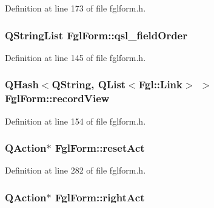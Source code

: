 Definition at line 173 of file fglform.h.

\hypertarget{classFglForm_ab53b016e506ad4ed7fdb2ac2210d43b1}{
\subsubsection[{qsl\_\-fieldOrder}]{\setlength{\rightskip}{0pt plus 5cm}QStringList {\bf FglForm::qsl\_\-fieldOrder}}}
\label{classFglForm_ab53b016e506ad4ed7fdb2ac2210d43b1}


Definition at line 145 of file fglform.h.

\hypertarget{classFglForm_a2e8895a4cd6f58cc36f31c8a51c06a54}{
\subsubsection[{recordView}]{\setlength{\rightskip}{0pt plus 5cm}QHash$<$QString, QList$<${\bf Fgl::Link}$>$ $>$ {\bf FglForm::recordView}}}
\label{classFglForm_a2e8895a4cd6f58cc36f31c8a51c06a54}


Definition at line 154 of file fglform.h.

\hypertarget{classFglForm_aa9bb2c29fa0161164dd5250a7602a1be}{
\subsubsection[{resetAct}]{\setlength{\rightskip}{0pt plus 5cm}QAction$\ast$ {\bf FglForm::resetAct}}}
\label{classFglForm_aa9bb2c29fa0161164dd5250a7602a1be}


Definition at line 282 of file fglform.h.

\hypertarget{classFglForm_ac85748725f2a9ba437e62be1293eae02}{
\subsubsection[{rightAct}]{\setlength{\rightskip}{0pt plus 5cm}QAction$\ast$ {\bf FglForm::rightAct}}}
\label{classFglForm_ac85748725f2a9ba437e62be1293eae02}


